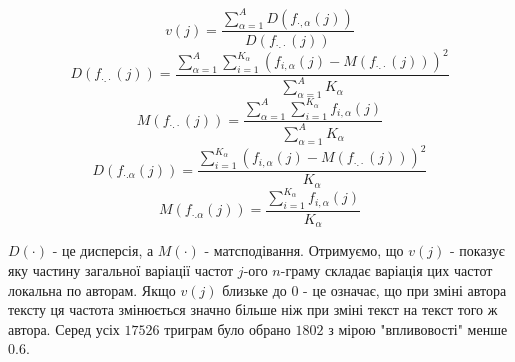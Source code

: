 \documentclass[12pt, a4paper]{extarticle}
\begin{document}
\begin{equation}\label{eq:15}
v(j) = \frac{\sum_{\alpha=1}^{A}D(f_{\cdot,\alpha}(j))}{D(f_{\cdot.\cdot}(j))}
\end{equation}
\begin{equation}\label{eq:16}
D(f_{\cdot.\cdot}(j)) = \frac{\sum_{\alpha=1}^A \sum_{i=1}^{K_\alpha} (f_{i,\alpha}(j) - M(f_{\cdot.\cdot}(j)))^2}{\sum_{\alpha=1}^A K_\alpha}
\end{equation}
\begin{equation}\label{eq:17}
M(f_{\cdot.\cdot}(j)) = \frac{\sum_{\alpha=1}^A \sum_{i=1}^{K_\alpha} f_{i,\alpha}(j)}{\sum_{\alpha=1}^A K_\alpha}
\end{equation}
\begin{equation}\label{eq:18}
D(f_{\cdot.\alpha}(j)) = \frac{\sum_{i=1}^{K_\alpha} (f_{i,\alpha}(j) - M(f_{\cdot.\cdot}(j)))^2}{K_\alpha}
\end{equation}
\begin{equation}\label{eq:19}
M(f_{\cdot.\alpha}(j)) = \frac{\sum_{i=1}^{K_\alpha} f_{i,\alpha}(j)}{K_\alpha}
\end{equation}

$D(\cdot)$ - це дисперсія, а $M(\cdot)$ - матсподівання. Отримуємо, що $v(j)$ - показує яку частину загальної варіації частот $j$-ого $n$-граму складає варіація цих частот локальна по авторам. Якщо $v(j)$ близьке до 0 - це означає, що при зміні автора тексту ця частота змінюється значно більше ніж при зміні текст на текст того ж автора. Серед усіх $17526$ триграм було обрано $1802$ з мірою "впливовості" менше 0.6.
\end{document}

